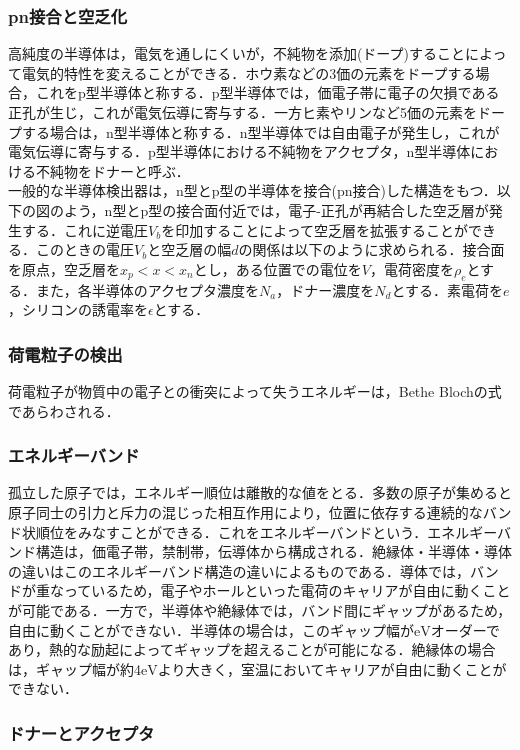 \subsubsection*{pn接合と空乏化}
高純度の半導体は，電気を通しにくいが，不純物を添加(ドープ)することによって電気的特性を変えることができる．ホウ素などの3価の元素をドープする場合，これをp型半導体と称する．p型半導体では，価電子帯に電子の欠損である正孔が生じ，これが電気伝導に寄与する．一方ヒ素やリンなど5価の元素をドープする場合は，n型半導体と称する．n型半導体では自由電子が発生し，これが電気伝導に寄与する．p型半導体における不純物をアクセプタ，n型半導体における不純物をドナーと呼ぶ．\\
一般的な半導体検出器は，n型とp型の半導体を接合(pn接合)した構造をもつ．以下の図のよう，n型とp型の接合面付近では，電子-正孔が再結合した空乏層が発生する．これに逆電圧$V_b$を印加することによって空乏層を拡張することができる．このときの電圧$V_b$と空乏層の幅$d$の関係は以下のように求められる．接合面を原点，空乏層を$x_p < x < x_n$とし，ある位置での電位を$V$，電荷密度を$\rho_e$とする．また，各半導体のアクセプタ濃度を$N_a$，ドナー濃度を$N_d$とする．素電荷を$e$，シリコンの誘電率を$\epsilon$とする．

\subsubsection*{荷電粒子の検出}
荷電粒子が物質中の電子との衝突によって失うエネルギーは，Bethe Blochの式であらわされる．

\subsubsection*{エネルギーバンド}
孤立した原子では，エネルギー順位は離散的な値をとる．多数の原子が集めると原子同士の引力と斥力の混じった相互作用により，位置に依存する連続的なバンド状順位をみなすことができる．これをエネルギーバンドという．エネルギーバンド構造は，価電子帯，禁制帯，伝導体から構成される．絶縁体・半導体・導体の違いはこのエネルギーバンド構造の違いによるものである．導体では，バンドが重なっているため，電子やホールといった電荷のキャリアが自由に動くことが可能である．一方で，半導体や絶縁体では，バンド間にギャップがあるため，自由に動くことができない．半導体の場合は，このギャップ幅が$\mathrm{eV}$オーダーであり，熱的な励起によってギャップを超えることが可能になる．絶縁体の場合は，ギャップ幅が約4$\mathrm{eV}$より大きく，室温においてキャリアが自由に動くことができない．

\subsubsection*{ドナーとアクセプタ}


